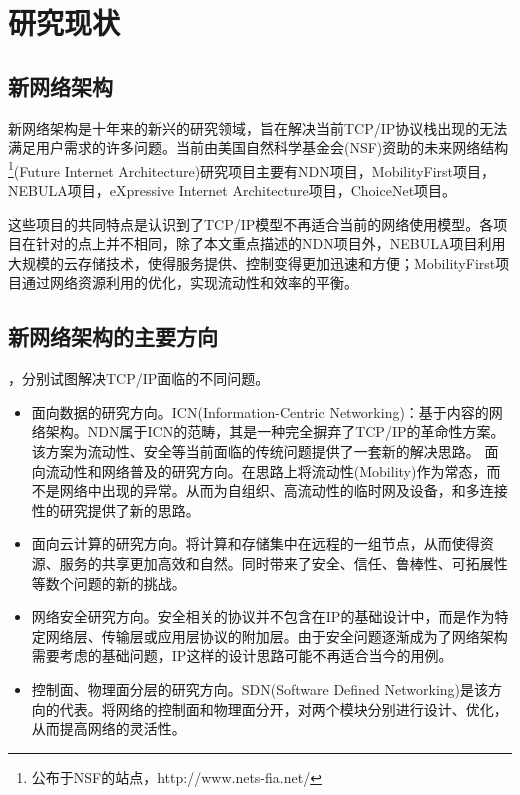 \section{研究现状}

\subsection{新网络架构}
\par
新网络架构是十年来的新兴的研究领域，旨在解决当前TCP/IP协议栈出现的无法满足用户需求的许多问题。当前由美国自然科学基金会(NSF)资助的未来网络结构\footnote{公布于NSF的站点，http://www.nets-fia.net/}(Future Internet Architecture)研究项目主要有NDN项目，MobilityFirst项目，NEBULA项目，eXpressive Internet Architecture项目，ChoiceNet项目。
\par
这些项目的共同特点是认识到了TCP/IP模型不再适合当前的网络使用模型。各项目在针对的点上并不相同，除了本文重点描述的NDN项目外，NEBULA项目利用大规模的云存储技术，使得服务提供、控制变得更加迅速和方便；MobilityFirst项目通过网络资源利用的优化，实现流动性和效率的平衡。
\subsection{新网络架构的主要方向}
，分别试图解决TCP/IP面临的不同问题。

\begin{itemize}
\item
面向数据的研究方向。ICN(Information-Centric Networking)：基于内容的网络架构。NDN属于ICN的范畴，其是一种完全摒弃了TCP/IP的革命性方案。该方案为流动性、安全等当前面临的传统问题提供了一套新的解决思路。
面向流动性和网络普及的研究方向。在思路上将流动性(Mobility)作为常态，而不是网络中出现的异常。从而为自组织、高流动性的临时网及设备，和多连接性的研究提供了新的思路。
\item
面向云计算的研究方向。将计算和存储集中在远程的一组节点，从而使得资源、服务的共享更加高效和自然。同时带来了安全、信任、鲁棒性、可拓展性等数个问题的新的挑战。
\item
网络安全研究方向。安全相关的协议并不包含在IP的基础设计中，而是作为特定网络层、传输层或应用层协议的附加层。由于安全问题逐渐成为了网络架构需要考虑的基础问题，IP这样的设计思路可能不再适合当今的用例。
\item
控制面、物理面分层的研究方向。SDN(Software Defined Networking)是该方向的代表。将网络的控制面和物理面分开，对两个模块分别进行设计、优化，从而提高网络的灵活性。
\end{itemize}

